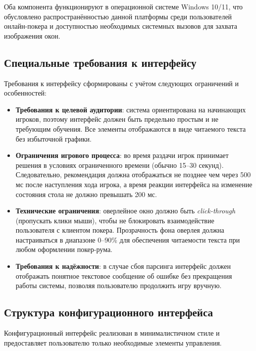 Оба компонента функционируют в операционной системе Windows 10/11, что обусловлено распространённостью данной платформы среди пользователей онлайн-покера и доступностью необходимых системных вызовов для захвата изображения окон.

\subsection{Специальные требования к интерфейсу}

Требования к интерфейсу сформированы с учётом следующих ограничений и особенностей:

\begin{itemize}
    \item \textbf{Требования к целевой аудитории}: система ориентирована на начинающих игроков, поэтому интерфейс должен быть предельно простым и не требующим обучения. Все элементы отображаются в виде читаемого текста без избыточной графики.
    
    \item \textbf{Ограничения игрового процесса}: во время раздачи игрок принимает решения в условиях ограниченного времени (обычно 15--30 секунд). Следовательно, рекомендация должна отображаться не позднее чем через 500 мс после наступления хода игрока, а время реакции интерфейса на изменение состояния стола не должно превышать 200 мс.
    
    \item \textbf{Технические ограничения}: оверлейное окно должно быть \textit{click-through} (пропускать клики мыши), чтобы не блокировать взаимодействие пользователя с клиентом покера. Прозрачность фона оверлея должна настраиваться в диапазоне 0--90\% для обеспечения читаемости текста при любом оформлении покер-рума.
    
    \item \textbf{Требования к надёжности}: в случае сбоя парсинга интерфейс должен отображать понятное текстовое сообщение об ошибке без прекращения работы системы, позволяя пользователю продолжить игру вручную.
\end{itemize}

\subsection{Структура конфигурационного интерфейса}

Конфигурационный интерфейс реализован в минималистичном стиле и предоставляет пользователю только необходимые элементы управления.

